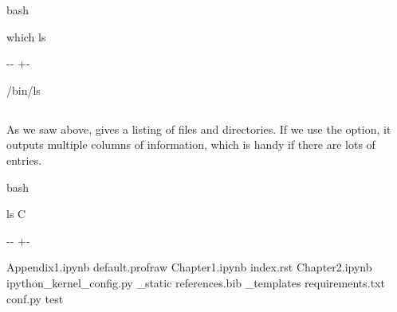 \documentclass[letterpaper,10pt,english]{sphinxmanual}
\newlength\nbsphinxcodecellspacing
\begin{document}
{
\begin{sphinxVerbatim}[commandchars=\\\{\}]
\llap{\color{nbsphinxin}[6]:\,\hspace{\fboxrule}\hspace{\fboxsep}}\PYGZpc{}\PYGZpc{}bash

which ls
\end{sphinxVerbatim}
}

{

\kern-\sphinxverbatimsmallskipamount\kern-\baselineskip
\kern+\FrameHeightAdjust\kern-\fboxrule
\vspace{\nbsphinxcodecellspacing}

\begin{sphinxVerbatim}[commandchars=\\\{\}]
/bin/ls
\end{sphinxVerbatim}
}


\subsection{}
\label{\detokenize{Appendix1:ls}}
As we saw above,  gives a listing of files and directories. If we use the  option, it outputs multiple columns of information, which is handy if there are lots of entries.

{
\begin{sphinxVerbatim}[commandchars=\\\{\}]
\llap{\color{nbsphinxin}[7]:\,\hspace{\fboxrule}\hspace{\fboxsep}}\PYGZpc{}\PYGZpc{}bash

ls \PYGZhy{}C
\end{sphinxVerbatim}
}

{

\kern-\sphinxverbatimsmallskipamount\kern-\baselineskip
\kern+\FrameHeightAdjust\kern-\fboxrule
\vspace{\nbsphinxcodecellspacing}

\begin{sphinxVerbatim}[commandchars=\\\{\}]
Appendix1.ipynb                 default.profraw
Chapter1.ipynb                  index.rst
Chapter2.ipynb                  ipython\_kernel\_config.py
\_static                                references.bib
\_templates                     requirements.txt
conf.py                         test
\end{sphinxVerbatim}
}
\end{document}
